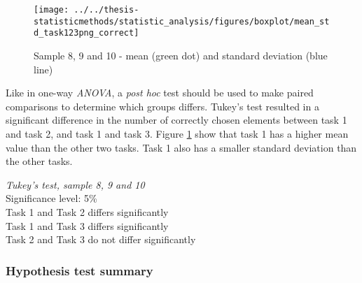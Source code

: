 \begin{figure}[h!]
	\centering
	\texttt{[image: ../../thesis-statisticmethods/statistic\_analysis/figures/boxplot/mean\_std\_task123png\_correct]}
	\caption{Sample 8, 9 and 10 - mean (green dot) and standard deviation (blue line)}
	\label{fig:meanstdtask123pngcorrect}
\end{figure}

Like in one-way \textit{ANOVA}, a \textit{post hoc} test should be used to make paired comparisons to determine which groups differs. Tukey's test resulted in a significant difference in the number of correctly chosen elements between task 1 and task 2, and task 1 and task 3. Figure \ref{fig:meanstdtask123pngcorrect} show that task 1 has a higher mean value than the other two tasks. Task 1 also has a smaller standard deviation than the other tasks. 

 \begin{center}
	\begin{tcolorbox}[box align=center,width=\textwidth-5cm]
		\centering
		\textit{Tukey's test, sample 8, 9 and 10}\\
		Significance level: 5\%  \\[0.5cm]
		
		Task 1 and Task 2 differs significantly \\
		Task 1 and Task 3 differs significantly \\
		Task 2 and Task 3 do not differ significantly \\[0.2cm]
	\end{tcolorbox} 
\end{center}

\vspace{0.5cm}

\subsubsection{Hypothesis test summary}

